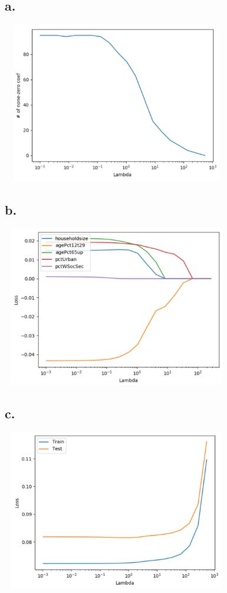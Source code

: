 \documentclass{article}
\begin{document}
\subsection*{a.}
\includegraphics[width=10cm, height=7cm]{A5_a.png}

\subsection*{b.}
\includegraphics[width=10cm, height=7cm]{A5_b.png}

\subsection*{c.}
\includegraphics[width=10cm, height=7cm]{A5_c.png}
\end{document}
